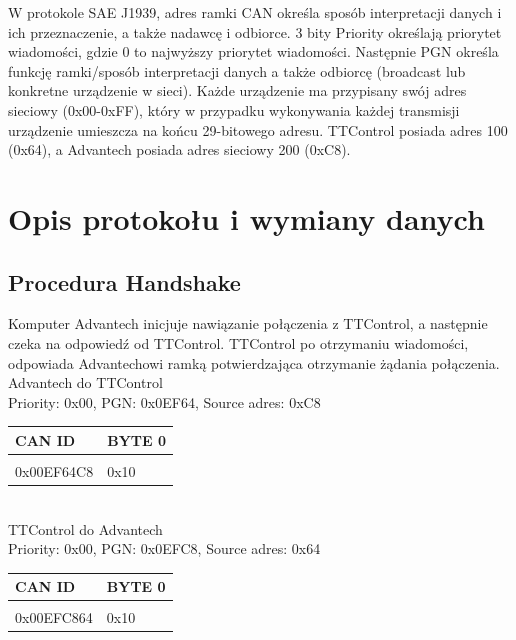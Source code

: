 \documentclass{article}
\begin{document}
W protokole SAE J1939, adres ramki CAN określa sposób interpretacji danych i ich przeznaczenie, a także nadawcę i odbiorce. 3 bity Priority określają priorytet wiadomości, gdzie 0 to najwyższy priorytet wiadomości. Następnie PGN określa funkcję ramki/sposób interpretacji danych a także odbiorcę (broadcast lub konkretne urządzenie w sieci). Każde urządzenie ma przypisany swój adres sieciowy (0x00-0xFF), który w przypadku wykonywania każdej transmisji urządzenie umieszcza na końcu  29-bitowego adresu. TTControl posiada adres 100 (0x64), a Advantech posiada adres sieciowy 200 (0xC8).\\

\section{Opis protokołu i wymiany danych}
\subsection{Procedura Handshake}
Komputer Advantech inicjuje nawiązanie połączenia z TTControl, a następnie czeka na odpowiedź od TTControl. TTControl po otrzymaniu wiadomości, odpowiada Advantechowi ramką potwierdzająca otrzymanie żądania połączenia.\\

Advantech do TTControl\\
Priority: 0x00, PGN: 0x0EF64, Source adres: 0xC8\\
\begin{left}
\begin{tabular}{ |p{2cm}|p{1.5cm}|} 
 \hline
 CAN ID & BYTE 0\\ \hline
 &\\
 0x00EF64C8 & 0x10\\ 
 \hline
\end{tabular}
\end{left}\\

TTControl do Advantech\\
Priority: 0x00, PGN: 0x0EFC8, Source adres: 0x64\\
\begin{left}
\begin{tabular}{ |p{2cm}|p{1.5cm}|} 
 \hline
 CAN ID & BYTE 0\\ \hline
 &\\
 0x00EFC864 & 0x10\\ 
 \hline
\end{tabular}
\end{left}\\
\end{document}
